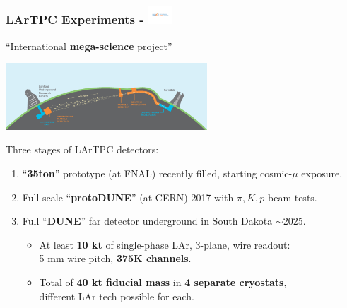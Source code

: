\begin{frame}[fragile]
  \frametitle{LArTPC Experiments - \includegraphics[height=7mm,trim=4cm 9.2cm 4cm 9.3cm,clip,valign=c]{DUNElogo_colorHORIZONTAL.pdf}}
  \begin{center}
    ``International \textbf{mega-science} project''

    \includegraphics[height=25mm]{LBNF_Graphic_021715-1024x340.png}
  \end{center}


  Three stages of LArTPC detectors:
  \begin{enumerate}\footnotesize
  \item ``\textbf{35ton}'' prototype (at FNAL) recently filled, starting cosmic-$\mu$ exposure. 
  \item Full-scale ``\textbf{protoDUNE}'' (at CERN) 2017 with $\pi, K, p$ beam tests.
  \item Full ``\textbf{DUNE}'' far detector underground in South Dakota $\sim$2025.
    \begin{itemize}
    \item At least \textbf{10 kt} of single-phase LAr, 3-plane, wire readout: \\
      5 mm wire pitch, \textbf{375K channels}.

    \item Total of \textbf{40 kt fiducial mass} in \textbf{4 separate cryostats}, \\
      \footnotesize{different LAr tech possible for each.}

    \end{itemize}
  \end{enumerate}

\end{frame}

